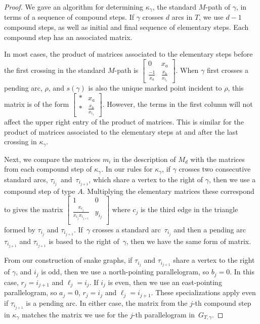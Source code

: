 \documentclass[pdftex]{sigma}%
\numberwithin{equation}{section}
\begin{document}
\begin{proof}
We gave an algorithm for determining $\kappa_\gamma$, the standard $M$-path of $\gamma$, in terms of a sequence of compound steps. If $\gamma$ crosses $d$ arcs in $T$, we use $d-1$ compound steps, as well as initial and final sequence of elementary steps. Each compound step has an associated matrix.

In most cases, the product of matrices associated to the elementary steps before the first crossing in the standard $M$-path is $\left[\begin{smallmatrix} 0 & x_a \\ \frac{-1}{x_a} & \frac{x_b}{x_{i_1}} \end{smallmatrix}\right]$. When $\gamma$ first crosses a pending arc, $\rho$, and $s(\gamma)$ is also the unique marked point incident to $\rho$, this matrix is of the form $\left[\begin{smallmatrix} * & x_a \\ * & \frac{x_b}{x_{i_1}} \end{smallmatrix}\right]$. However, the terms in the first column will not affect the upper right entry of the product of matrices. This is similar for the product of matrices associated to the elementary steps at and after the last crossing in $\kappa_\gamma$.

Next, we compare the matrices $m_i$ in the description of $M_d$ with the matrices from each compound step of $\kappa_\gamma$. In our rules for $\kappa_\gamma$, if $\gamma$ crosses two consecutive standard arcs, $\tau_{i_j}$~and~$\tau_{i_{j+1}}$, which share a vertex to the right of $\gamma$, then we use a compound step of type $A$. Multiplying the elementary matrices these correspond to gives the matrix $\left[\begin{smallmatrix} 1 & 0 \\ \frac{x_{c_j}}{x_{i_j}x_{i_{j+1}}} & y_{i_j} \\ \end{smallmatrix}\right]$ where $c_j$ is the third edge in the triangle formed by $\tau_{i_j}$ and $\tau_{i_{j+1}}$. If~$\gamma$ crosses a standard arc~$\tau_{i_j}$ and then a pending arc $\tau_{i_{j+1}}$ and $\tau_{i_{j+1}}$ is based to the right of~$\gamma$, then we have the same form of matrix.

From our construction of snake graphs, if $\tau_{i_j}$ and $\tau_{i_{j+1}}$ share a vertex to the right of $\gamma$, and $i_j$ is odd, then we use a north-pointing parallelogram, so $b_j = 0$. In this case, $r_j = i_{j+1}$ and $\ell_j = i_j$.
If $i_j$ is even, then we use an east-pointing parallelogram, so $a_j =0$, $r_j = i_j$ and $\ell_j = i_{j+1}$.
These specializations apply even if $\tau_{i_{j+1}}$ is a pending arc. In either case, the matrix from the $j$-th compound step in $\kappa_\gamma$ matches the matrix we use for the $j$-th parallelogram in~$G_{T,\gamma}$.


\end{proof}
\end{document}
